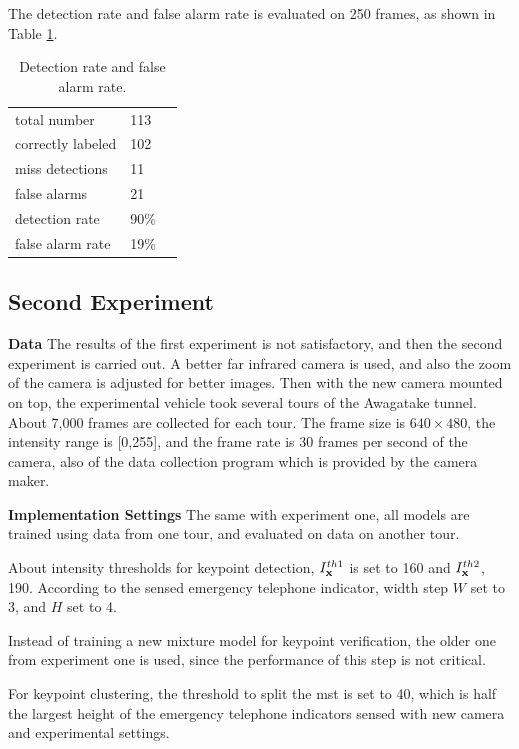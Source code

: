 The detection rate and false alarm rate is evaluated on 250 frames, as shown in Table \ref{ex1:tb2}.

\begin{table}[h]
\centering
\begin{tabular}{lll}
     \hline
     \hline
    total number &	113   \\
    correctly labeled &	102   \\
    miss detections &	11 &	  \\
    false alarms &	21    \\
    detection rate &	90\% &	  \\
    false alarm rate &	19\% &	   \\
   \hline
\end{tabular}
\caption{Detection rate and false alarm rate.}\label{ex1:tb2}
\end{table}

\subsection{Second Experiment}



\textbf{Data} The results of the first experiment is not satisfactory, and then the second experiment is carried out. A better far infrared camera is used, and also the zoom of the camera is adjusted for better images. Then with the new camera mounted on top, the experimental vehicle took several tours of the Awagatake tunnel. About 7,000 frames are collected for each tour. The frame size is $640\times 480$, the intensity range is [0,255], and the frame rate is 30 frames per second of the camera, also of the data collection program which is provided by the camera maker.

\textbf{Implementation Settings} The same with experiment one, all models are trained using data from one tour, and evaluated on data on another tour.

About intensity thresholds for keypoint detection, $I^{th1}_{\bf{x}}$ is set to 160 and $I^{th2}_{\bf{x}}$, 190. According to the sensed emergency telephone indicator, width step $W$ set to 3, and $H$ set to 4.

Instead of training a new mixture model for keypoint verification, the older one from experiment one is used, since the performance of this step is not critical.

For keypoint clustering, the threshold to split the mst is set to 40, which is half the largest height of the emergency telephone indicators sensed with new camera and experimental settings.


